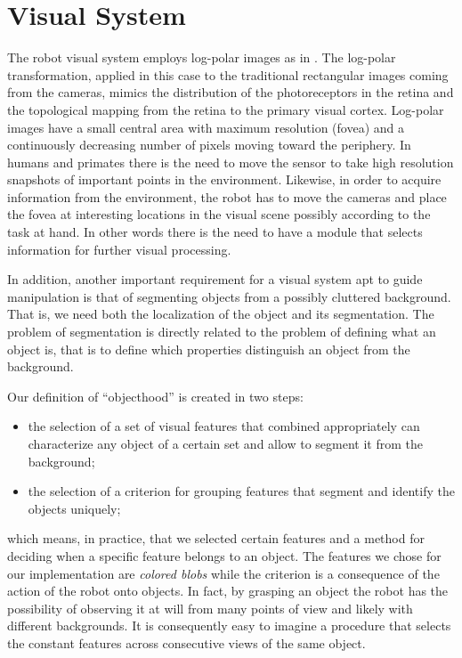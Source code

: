 \section{Visual System}
\label{sect:vision}

The robot visual system employs log-polar images as in \cite{sandini80retinalike}. The log-polar transformation, applied in this case to the traditional rectangular images coming from the cameras, mimics the distribution of the photoreceptors in the retina and the topological mapping from the retina to the primary visual cortex. Log-polar images have a small central area with maximum resolution (fovea) and a continuously decreasing number of pixels moving toward the periphery. In humans and primates there is the need to move the sensor to take high resolution snapshots of important points in the environment. Likewise, in order to acquire information from the environment, the robot has to move the cameras and place the fovea at interesting locations in the visual scene possibly according to the task at hand. In other words there is the need to have a module that selects information for further visual processing.

In addition, another important requirement for a visual system apt to guide manipulation is that of segmenting objects from a possibly cluttered background. That is, we need both the localization of the object and its segmentation. The problem of segmentation is directly related to the problem of defining what an object is, that is to define which properties distinguish an object from the background.

Our definition of ``objecthood'' is created in two steps:
\begin{itemize}
\item the selection of a set of visual features that combined appropriately can characterize any object of a certain set and allow to segment it from the background;
\item the selection of a criterion for grouping features that segment and identify the objects uniquely;
\end{itemize}
\noindent which means, in practice, that we selected certain features and a method for deciding when a specific feature belongs to an object. The features we chose for our implementation are {\em colored blobs} while the criterion is a consequence of the action of the robot onto objects. In fact, by grasping an object the robot has the possibility of observing it at will from many points of view and likely with different backgrounds. It is consequently easy to imagine a procedure that selects the constant features across consecutive views of the same object.

